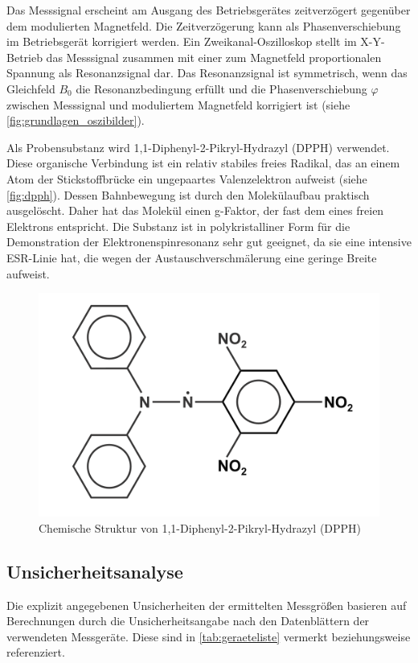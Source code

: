 \documentclass[ngerman]{scrartcl}
\begin{document}
%
Das Messsignal erscheint am Ausgang des Betriebsgerätes zeitverzögert gegenüber dem modulierten Magnetfeld. Die Zeitverzögerung kann als Phasenverschiebung im Betriebsgerät korrigiert werden. Ein Zweikanal-Oszilloskop stellt im X-Y-Betrieb das Messsignal zusammen mit einer zum Magnetfeld proportionalen Spannung als Resonanzsignal dar. Das Resonanzsignal ist symmetrisch, wenn das Gleichfeld $B_0$ die Resonanzbedingung erfüllt und die Phasenverschiebung $\varphi$ zwischen Messsignal und moduliertem Magnetfeld korrigiert ist (siehe \autoref{fig:grundlagen_oszibilder}).

Als Probensubstanz wird 1,1-Diphenyl-2-Pikryl-Hydrazyl (DPPH) verwendet. Diese organische Verbindung ist ein relativ stabiles freies Radikal, das an einem Atom der Stickstoffbrücke ein ungepaartes Valenzelektron aufweist (siehe \autoref{fig:dpph}). Dessen Bahnbewegung ist durch den Molekülaufbau praktisch ausgelöscht. Daher hat das Molekül einen g-Faktor, der fast dem eines freien Elektrons entspricht. Die Substanz ist in polykristalliner Form für die Demonstration der Elektronenspinresonanz sehr gut geeignet, da sie eine intensive ESR-Linie hat, die wegen der Austauschverschmälerung eine geringe Breite aufweist.
%
\begin{figure}[H]
    \centering
    \begin{samepage}
        \includegraphics[width=0.5\linewidth]{fig/dpph.png}
        \caption[DPPH]{Chemische Struktur von 1,1-Diphenyl-2-Pikryl-Hydrazyl (DPPH)}
        \label{fig:dpph}
    \end{samepage}
\end{figure}


\subsection{Unsicherheitsanalyse}
\label{subsec:unsicherheitsanalyse}

Die explizit angegebenen Unsicherheiten der ermittelten Messgrößen basieren auf Berechnungen durch die Unsicherheitsangabe nach den Datenblättern der verwendeten Messgeräte. Diese sind in \autoref{tab:geraeteliste} vermerkt beziehungsweise referenziert.
\end{document}

